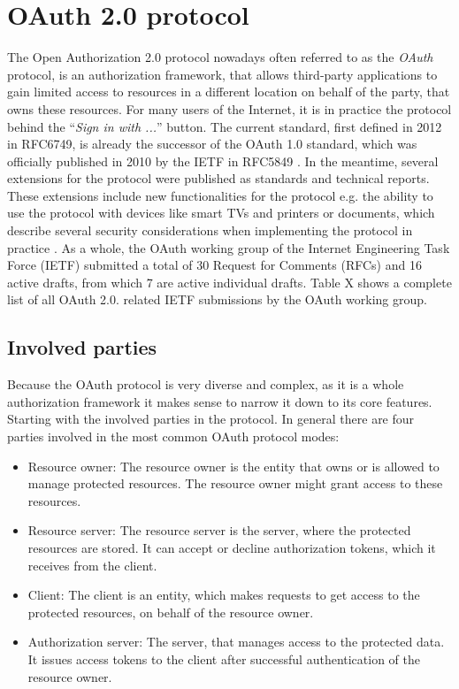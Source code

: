 \documentclass[
    fontsize=12pt,
    headings=small,
    parskip=half,           %
    bibliography=totoc,
    numbers=noenddot,       %
    open=any,               %
    ]{scrreprt}
\begin{document}
\section{OAuth 2.0 protocol}
The Open Authorization 2.0 protocol nowadays often referred to as the
\emph{OAuth} protocol, is an authorization framework, that allows third-party
applications to gain limited access to resources in a different location on
behalf of the party, that owns these resources. For many users of the Internet,
it is in practice the protocol behind the ``\emph{Sign in with ...}'' button.
The current standard, first defined in 2012 in RFC6749, is already the
successor of the OAuth 1.0 standard, which was officially published in 2010 by
the IETF in RFC5849 \cite{hammer2010rfc}. In the meantime, several extensions
for the protocol were published as standards and technical reports. These
extensions include new functionalities for the protocol e.g. the ability to use
the protocol with devices like smart TVs and printers \cite{denniss2019oauth}
or documents, which describe several security considerations when implementing
the protocol in practice \cite{lodderstedt2020oauth}. As a whole, the OAuth
working group of the Internet Engineering Task Force (IETF) submitted a total
of 30 Request for Comments (RFCs) and 16 active drafts, from which 7 are active
individual drafts. Table X shows a complete list of all OAuth 2.0. related IETF
submissions by the OAuth working group. 

\subsection{Involved parties}
Because the OAuth protocol is very diverse and complex, as it is a
whole authorization framework it makes sense to narrow it down to its core
features. Starting with the involved parties in the protocol. In general there
are four parties involved in the most common OAuth protocol modes:

\begin{itemize} 

    \item Resource owner: The resource owner is the entity that owns or is
        allowed to manage protected resources. The resource owner might grant
        access to these resources. 

    \item Resource server: The resource server is the server, where the
        protected resources are stored. It can accept or decline authorization
        tokens, which it receives from the client. 

    \item Client: The client is an entity, which makes requests to get access
        to the protected resources, on behalf of the resource owner. 
        
    \item Authorization server: The server, that manages access to the
        protected data. It issues access tokens to the client after successful
        authentication of the resource owner. 

\end{itemize}
\end{document}

